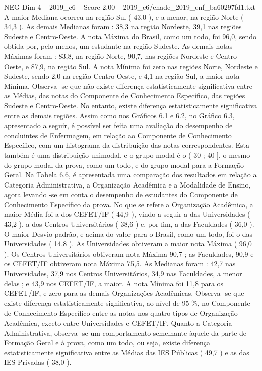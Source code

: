 \begin{textsample}{NEG Dim 4 – 2019\_c6 – Score 2.00 – 2019\_c6/enade\_2019\_enf\_ba60297fd1.txt}
A maior Mediana ocorreu na região Sul ( 43,0 ), e a menor, na região Norte ( 34,3 ).
As demais Medianas foram : 38,3 na região Nordeste, 39,1 nas regiões Sudeste e Centro-Oeste.
A nota Máxima do Brasil, como um todo, foi 96,0, sendo obtida por, pelo menos, um estudante na região Sudeste.
As demais notas Máximas foram : 83,8, na região Norte, 90,7, nas regiões Nordeste e Centro-Oeste, e 87,9, na região Sul.
A nota Mínima foi zero nas regiões Norte, Nordeste e Sudeste, sendo 2,0 na região Centro-Oeste, e 4,1 na região Sul, a maior nota Mínima.
Observa -se que não existe diferença estatisticamente significativa entre as Médias, das notas do Componente de Conhecimento Específico, das regiões Sudeste e Centro-Oeste.
No entanto, existe diferença estatisticamente significativa entre as demais regiões.
Assim como nos Gráficos 6.1 e 6.2, no Gráfico 6.3, apresentado a seguir, é possível ser feita uma avaliação do desempenho de concluintes de Enfermagem, em relação ao Componente de Conhecimento Específico, com um histograma da distribuição das notas correspondentes.
Esta também é uma distribuição unimodal, e o grupo modal é o ( 30 ; 40 ], o mesmo do grupo modal da prova, como um todo, e do grupo modal para a Formação Geral.
Na Tabela 6.6, é apresentada uma comparação dos resultados em relação a Categoria Administrativa, a Organização Acadêmica e a Modalidade de Ensino, agora levando -se em conta o desempenho de estudantes do Componente de Conhecimento Específico da prova.
No que se refere a Organização Acadêmica, a maior Média foi a dos CEFET/IF ( 44,9 ), vindo a seguir a das Universidades ( 43,2 ), a dos Centros Universitários ( 38,6 ) e, por fim, a das Faculdades ( 36,0 ).
O maior Desvio padrão, e acima do valor para o Brasil, como um todo, foi o das Universidades ( 14,8 ).
As Universidades obtiveram a maior nota Máxima ( 96,0 ).
Os Centros Universitários obtiveram nota Máxima 90,7 ; as Faculdades, 90,9 e os CEFET/IF obtiveram nota Máxima 75,5.
As Medianas foram : 42,7 nas Universidades, 37,9 nos Centros Universitários, 34,9 nas Faculdades, a menor delas ; e 43,9 nos CEFET/IF, a maior.
A nota Mínima foi 11,8 para os CEFET/IF, e zero para as demais Organizações Acadêmicas.
Observa -se que existe diferença estatisticamente significativa, ao nível de 95 \%, no Componente de Conhecimento Específico entre as notas nos quatro tipos de Organização Acadêmica, exceto entre Universidades e CEFET/IF.
Quanto a Categoria Administrativa, observa -se um comportamento semelhante àquele da parte de Formação Geral e à prova, como um todo, ou seja, existe diferença estatisticamente significativa entre as Médias das IES Públicas ( 49,7 ) e as das IES Privadas ( 38,0 ).

\end{textsample}
